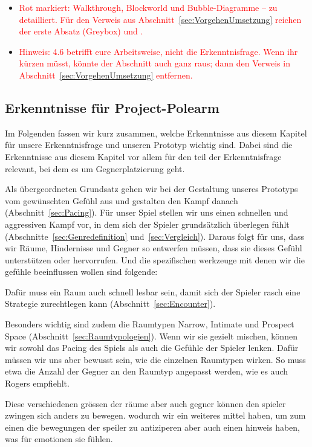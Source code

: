 \documentclass[../Main.tex]{subfiles}
\begin{document}
\begin{itemize}[leftmargin=1.5cm]
    \item \textcolor{red}{Rot markiert: Walkthrough, Blockworld und Bubble-Diagramme -- zu detailliert. Für den Verweis aus Abschnitt~\ref{sec:VorgehenUmsetzung} reichen der erste Absatz (Greybox) und .}
    \item \textcolor{red}{Hinweis: 4.6 betrifft eure Arbeitsweise, nicht die Erkenntnisfrage. Wenn ihr kürzen müsst, könnte der Abschnitt auch ganz raus; dann den Verweis in Abschnitt~\ref{sec:VorgehenUmsetzung} entfernen.}
\end{itemize}

\subsection{Erkenntnisse für Project-Polearm} \label{sec:ZwischenfazitLD}

Im Folgenden fassen wir kurz zusammen, welche Erkenntnisse aus diesem Kapitel für unsere Erkenntnisfrage und unseren Prototyp wichtig sind. Dabei sind die Erkenntnisse aus diesem Kapitel vor allem für den teil der Erkenntnisfrage relevant, bei dem es um Gegnerplatzierung geht.

Als übergeordneten Grundsatz gehen wir bei der Gestaltung unseres Prototyps vom gewünschten Gefühl aus und gestalten den Kampf danach (Abschnitt~\ref{sec:Pacing}). Für unser Spiel stellen wir uns einen schnellen und aggressiven Kampf vor, in dem sich der Spieler grundsätzlich überlegen fühlt (Abschnitte~\ref{sec:Genredefinition} und~\ref{sec:Vergleich}). Daraus folgt für uns, dass wir Räume, Hindernisse und Gegner so entwerfen müssen, dass sie dieses Gefühl unterstützen oder hervorrufen. Und die spezifischen werkzeuge mit denen wir die gefühle beeinflussen wollen sind folgende:

Dafür muss ein Raum auch schnell lesbar sein, damit sich der Spieler rasch eine Strategie zurechtlegen kann (Abschnitt~\ref{sec:Encounter}).

Besonders wichtig sind zudem die Raumtypen Narrow, Intimate und Prospect Space (Abschnitt~\ref{sec:Raumtypologien}). Wenn wir sie gezielt mischen, können wir sowohl das Pacing des Spiels als auch die Gefühle der Spieler lenken. Dafür müssen wir uns aber bewusst sein, wie die einzelnen Raumtypen wirken. So muss etwa die Anzahl der Gegner an den Raumtyp angepasst werden, wie es auch Rogers empfiehlt.

Diese verschiedenen grössen der räume aber auch gegner können den spieler zwingen sich anders zu bewegen. wodurch wir ein weiteres mittel haben, um zum einen die bewegungen der speiler zu antiziperen aber auch einen hinweis haben, was für emotionen sie fühlen.
\end{document}
